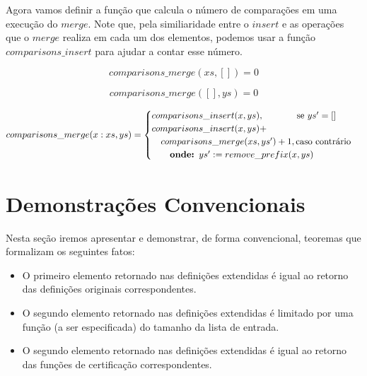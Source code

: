 \documentclass[12pt, oneside, a4paper,english,brazil]{abntex2}
\begin{document}
\qquad Agora vamos definir a fun\c{c}\~ao que calcula o n\'umero de compara\c{c}\~oes em uma execu\c{c}\~ao
do $merge$. Note que, pela similiaridade entre
o $insert$ e as opera\c{c}\~oes que o $merge$ realiza em cada um dos elementos,
podemos usar a fun\c{c}\~ao $comparisons\_insert$ para ajudar a contar esse n\'umero.

\begin{equation} \label{comp_merge_base_1}
  comparisons\_merge(xs, []) = 0
\end{equation}

\begin{equation} \label{comp_merge_base_2}
  comparisons\_merge([], ys) = 0
\end{equation}

\begin{equation} \label{comp_merge_ind}
\begin{split}
  comparisons\_merge(x : xs, ys) =
      \begin{cases}
        comparisons\_insert(x, ys), \text{\qquad \quad \,\, se } ys' = [] \\
        comparisons\_insert(x, ys) + \\ \text{\quad} comparisons\_merge(xs, ys') + 1, \text{caso contr\'ario}\\
        \text{\qquad\textbf{onde: }} ys' := remove\_prefix(x, ys)
      \end{cases} \\
\end{split}
\end{equation}

\chapter{Demonstra\c{c}\~oes Convencionais}

Nesta se\c{c}\~ao iremos apresentar e demonstrar, de forma convencional, teoremas que formalizam os seguintes fatos:
\begin{itemize}
  \item O primeiro elemento retornado nas defini\c{c}\~oes extendidas \'e igual ao retorno das defini\c{c}\~oes originais correspondentes.
  \item O segundo elemento retornado nas defini\c{c}\~oes extendidas \'e limitado por uma fun\c{c}\~ao (a ser especificada) do tamanho da lista de entrada.
  \item O segundo elemento retornado nas defini\c{c}\~oes extendidas \'e igual ao retorno das fun\c{c}\~oes de certifica\c{c}\~ao correspondentes.
\end{itemize}
\end{document}
